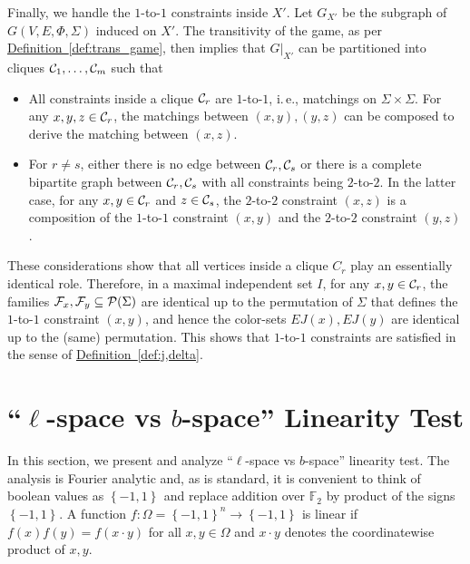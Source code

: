 \documentclass[11pt]{article}
\numberwithin{equation}{section}
\theoremstyle{definition}
\theoremstyle{plain}
\newcommand{\ie}{i.\,e.}
\newcommand{\expref}[2]{\hyperref[#2]{#1~\ref{#2}}}
\newcommand\set[1]{{\left\{ #1 \right\}}}
\newcommand\cube[1]{ { \set{-1,1}^{#1} } }
\begin{document}
Finally, we handle the $1$-to-$1$ constraints inside $X'$. Let $G_{X'}$ be the subgraph of
$G(V,E,\Phi, \Sigma)$ induced on $X'$.  The
transitivity of the game, as per \expref{Definition}{def:trans_game},
then implies that $G|_{X'}$ can be partitioned into
cliques ${\cal C}_1,\ldots,{\cal C}_m$ such that
\begin{itemize}
\item All constraints inside a clique ${\cal C}_r$ are $1$-to-$1$, \ie, matchings on $\Sigma \times \Sigma$.
      For any $x,y,z \in {\cal C}_r$,
      the matchings between $(x,y), (y,z)$ can be composed to derive the matching between $(x,z)$.
\item For $r\neq s$, either there is no edge between ${\cal C}_r, {\cal C}_s$ or there is
a complete bipartite graph between ${\cal C}_r, {\cal C}_s$ with all constraints being $2$-to-$2$.
In the latter case, for any $x, y \in {\cal C}_r$ and $z \in {\cal C}_s$, the $2$-to-$2$ constraint $(x,z)$ is
a composition of the $1$-to-$1$ constraint $(x,y)$ and the $2$-to-$2$ constraint $(y,z)$.
\end{itemize}
These considerations show that all vertices inside a clique $C_r$ play an essentially identical role. Therefore,
in a maximal independent set $I$, for any $x, y \in {\cal C}_r$,
the families ${\cal F}_x, {\cal F}_y \subseteq {\cal P}(\Sigma)$ are identical up to the permutation of
$\Sigma$ that defines the $1$-to-$1$ constraint $(x,y)$, and hence the color-sets $EJ(x), EJ(y)$ are
identical up to the (same) permutation. This shows that $1$-to-$1$ constraints are satisfied in the
sense of \expref{Definition}{def:j,delta}.







\section{\texorpdfstring{``$\ell$-space vs $b$-space''}{``l-space vs b-space''}
  Linearity Test}\label{appendix:linearity_testing}
In this section, we present and analyze ``$\ell$-space vs $b$-space'' linearity test. The analysis is Fourier
analytic and, as is standard, it is convenient to think of boolean values as $\cube{}$ and replace addition
over ${\mathbb F}_2$ by product of the signs $\cube{}$.
A function $f: \Omega = \cube{n}
\to \cube{}$ is linear if $f(x) f(y) = f(x\cdot y)$ for all $x, y \in \Omega$ and $x\cdot y$ denotes the coordinatewise
product of $x, y$.
\end{document}
